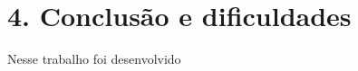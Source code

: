 \documentclass[brazil,a4paper,11pt]{article}
\begin{document}
\section{4. Conclusão e dificuldades}

Nesse trabalho foi desenvolvido 






\end{document}
